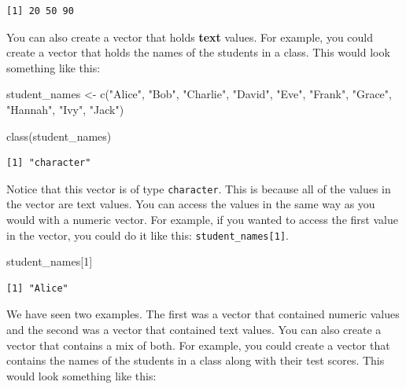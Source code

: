 \documentclass[
  letterpaper,
  DIV=11,
  numbers=noendperiod]{scrreprt}
\newenvironment{Shaded}{\begin{snugshade}}{\end{snugshade}}
\newcommand{\DecValTok}[1]{\textcolor[rgb]{0.68,0.00,0.00}{#1}}
\newcommand{\FunctionTok}[1]{\textcolor[rgb]{0.28,0.35,0.67}{#1}}
\newcommand{\NormalTok}[1]{\textcolor[rgb]{0.00,0.23,0.31}{#1}}
\newcommand{\OtherTok}[1]{\textcolor[rgb]{0.00,0.23,0.31}{#1}}
\newcommand{\StringTok}[1]{\textcolor[rgb]{0.13,0.47,0.30}{#1}}
\begin{document}
\begin{verbatim}
[1] 20 50 90
\end{verbatim}

You can also create a vector that holds \textbf{text} values. For
example, you could create a vector that holds the names of the students
in a class. This would look something like this:

\begin{Shaded}
\begin{Highlighting}[]
\NormalTok{student\_names }\OtherTok{\textless{}{-}} \FunctionTok{c}\NormalTok{(}\StringTok{"Alice"}\NormalTok{, }\StringTok{"Bob"}\NormalTok{, }\StringTok{"Charlie"}\NormalTok{, }\StringTok{"David"}\NormalTok{, }\StringTok{"Eve"}\NormalTok{, }\StringTok{"Frank"}\NormalTok{, }\StringTok{"Grace"}\NormalTok{, }\StringTok{"Hannah"}\NormalTok{, }\StringTok{"Ivy"}\NormalTok{, }\StringTok{"Jack"}\NormalTok{)}

\FunctionTok{class}\NormalTok{(student\_names)}
\end{Highlighting}
\end{Shaded}

\begin{verbatim}
[1] "character"
\end{verbatim}

Notice that this vector is of type \texttt{character}. This is because
all of the values in the vector are text values. You can access the
values in the same way as you would with a numeric vector. For example,
if you wanted to access the first value in the vector, you could do it
like this: \texttt{student\_names{[}1{]}}.

\begin{Shaded}
\begin{Highlighting}[]
\NormalTok{student\_names[}\DecValTok{1}\NormalTok{]}
\end{Highlighting}
\end{Shaded}

\begin{verbatim}
[1] "Alice"
\end{verbatim}

We have seen two examples. The first was a vector that contained numeric
values and the second was a vector that contained text values. You can
also create a vector that contains a mix of both. For example, you could
create a vector that contains the names of the students in a class along
with their test scores. This would look something like this:
\end{document}
